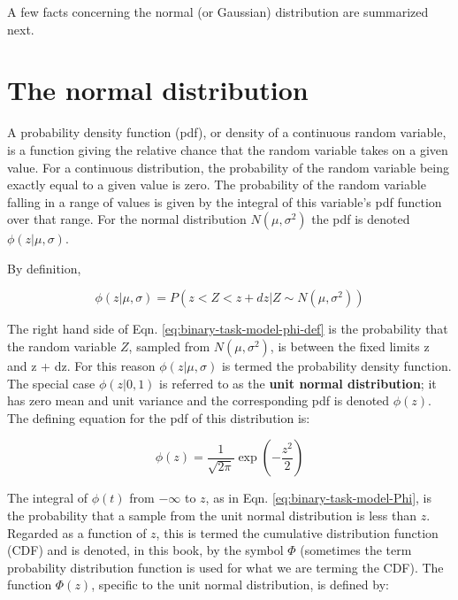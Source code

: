\documentclass[
]{book}
\begin{document}
A few facts concerning the normal (or Gaussian) distribution are summarized next.

\hypertarget{binary-task-model-normal-distribution}{%
\section{The normal distribution}\label{binary-task-model-normal-distribution}}

A probability density function (pdf), or density of a continuous random variable, is a function giving the relative chance that the random variable takes on a given value. For a continuous distribution, the probability of the random variable being exactly equal to a given value is zero. The probability of the random variable falling in a range of values is given by the integral of this variable's pdf function over that range. For the normal distribution \(N(\mu,\sigma^2)\) the pdf is denoted \(\phi(z|\mu,\sigma)\).

By definition,

\begin{equation} 
\phi\left ( z|\mu,\sigma \right )=P(z<Z<z+dz|Z \sim N(\mu,\sigma^2))
\label{eq:binary-task-model-phi-def}
\end{equation}

The right hand side of Eqn. \eqref{eq:binary-task-model-phi-def} is the probability that the random variable \(Z\), sampled from \(N(\mu,\sigma^2)\), is between the fixed limits z and z + dz. For this reason \(\phi(z|\mu,\sigma)\) is termed the probability density function. The special case \(\phi(z|0,1)\) is referred to as the \textbf{unit normal distribution}; it has zero mean and unit variance and the corresponding pdf is denoted \(\phi(z)\). The defining equation for the pdf of this distribution is:

\begin{equation} 
\phi\left ( z \right )=\frac{1}{\sqrt{2\pi}}\exp\left ( -\frac{z^2}{2} \right )
\label{eq:binary-task-model-phi}
\end{equation}

The integral of \(\phi(t)\) from \(-\infty\) to \(z\), as in Eqn. \eqref{eq:binary-task-model-Phi}, is the probability that a sample from the unit normal distribution is less than \(z\). Regarded as a function of \(z\), this is termed the cumulative distribution function (CDF) and is denoted, in this book, by the symbol \(\Phi\) (sometimes the term probability distribution function is used for what we are terming the CDF). The function \(\Phi(z)\), specific to the unit normal distribution, is defined by:
\end{document}
